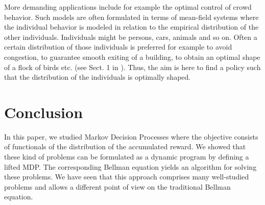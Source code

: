 \documentclass[reqno, 12pt]{amsart}%
\theoremstyle{definition}
\numberwithin{equation}{section} \numberwithin{theorem}{section}
\begin{document}
More demanding applications include for example the optimal control of crowd behavior. Such models  are often formulated in terms of mean-field systems \cite{carmona2018probabilistic} where the individual behavior is modeled in relation to the empirical distribution of the other individuals. Individuals might be persons, cars, animals and so on. Often a certain distribution of those individuals is preferred for example to avoid congestion, to guarantee smooth exiting of a building, to obtain an optimal shape of a flock of birds etc. (see Sect. 1 in \cite{carmona2018probabilistic}). Thus, the aim is here to find a policy such that the distribution of the individuals is optimally shaped.

\section{Conclusion}
In this paper, we studied Markov Decision Processes where the objective consists of functionals of the distribution of the accumulated reward. We showed that these kind of problems can be formulated as a dynamic program by defining a lifted MDP. The corresponding Bellman equation yields an algorithm for solving these problems. We have seen that this approach comprises many well-studied problems and allows a different point of view on the traditional Bellman equation.



% 

\end{document}
